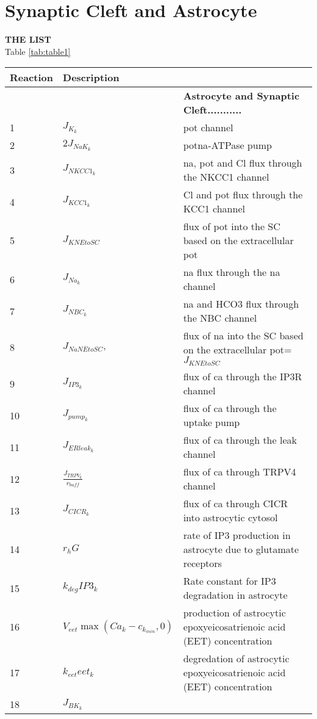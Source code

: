 \documentclass[]{article}
\newcommand{\na}{\gls{na}\xspace}
\newcommand{\pot}{\gls{pot}\xspace}
\newcommand{\ca}{\gls{ca}\xspace}
\begin{document}
\section{Synaptic Cleft and Astrocyte}
\textbf{THE LIST }\\
Table \ref{tab:table1}
\begin{longtable}[h!] { p{0.12\linewidth}  p{0.28\linewidth}     p{0.6\linewidth} }
	\hline
	Reaction     &    Description &  \\
	\hline
&  &  \textbf{Astrocyte and Synaptic Cleft...........}	 \\
1	&    $J_{K_k}$			& \pot channel				\\
2	&   $2J_{NaK_k}$ 			& \pot \na -ATPase pump \\
3	&   	 $J_{NKCC1_k}$ 	    	& \na, \pot and Cl flux through the NKCC1 channel\\
4	& 	  $J_{KCC1_k}$ 		&  Cl and \pot flux through the KCC1 channel \\		
5	& 	  $J_{KNEtoSC}$			& flux of \pot into the SC based on the extracellular \pot  \\ 
6	& 	  $J_{Na_k}$		& \na flux through the \na channel   \\ 
7	& 	  $J_{NBC_k}$	& \na and HCO3 flux through the NBC channel  \\ 
8	&	  $J_{NaNEtoSC},$ 	& flux of \na into the SC based on the extracellular \pot =  $J_{KNEtoSC}$\\
9	& 	   $J_{IP3_k}$  & flux of \ca through the IP3R channel \\
10	& 	  $J_{pump_k}$	& flux of \ca through the uptake pump \\
11 & 	  $J_{ERleak_k}$ & flux of \ca through the leak channel\\
12	& 	  $\frac{J_{TRPV_k}}{r_{buff}}$ &flux of \ca through TRPV4 channel \\
13	& 	  $J_{CICR_k}$  & flux of \ca through CICR into astrocytic cytosol \\
14	& 	  $r_h G$ &  rate of IP3 production in astrocyte due to glutamate receptors\\
15	& 	   $k_{deg}IP3_k$ & Rate constant for IP3 degradation in astrocyte\\
16	& 	   $V_{eet} \max(Ca_k - c_{k_{min}}, 0)$ & production of astrocytic epoxyeicosatrienoic acid (EET) concentration\\
17	& 	   $k_{eet}eet_k$ & degredation of astrocytic epoxyeicosatrienoic acid (EET) concentration\\
18	& 	   $J_{BK_k}$ & \\

\end{longtable}
\end{document}
